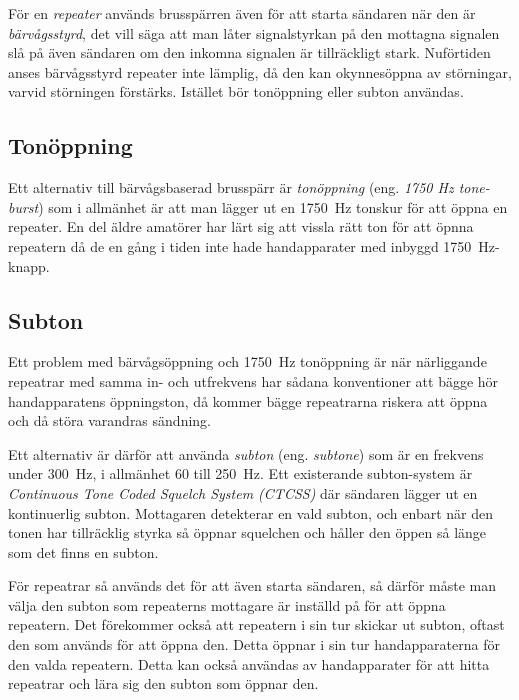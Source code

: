 För en \emph{repeater} används brusspärren även för att starta sändaren när den
är \emph{bärvågsstyrd}, det vill säga att man låter signalstyrkan på den
mottagna signalen slå på även sändaren om den inkomna signalen är tillräckligt
stark.
Nuförtiden anses bärvågsstyrd repeater inte lämplig, då den kan okynnesöppna av
störningar, varvid störningen förstärks.
Istället bör tonöppning eller subton användas.

\subsection{Tonöppning}
\label{tonöppning}

Ett alternativ till bärvågsbaserad brusspärr är \emph{tonöppning} (eng.
\emph{1750 Hz tone-burst}) som i allmänhet är att man lägger ut en
\qty{1750}{\hertz} tonskur för att öppna en repeater.
En del äldre amatörer har lärt sig att vissla rätt ton för att öpnna repeatern
då de en gång i tiden inte hade handapparater med inbyggd 1750~Hz-knapp.

\subsection{Subton}
\label{subton}

Ett problem med bärvågsöppning och \qty{1750}{\hertz} tonöppning är när
närliggande repeatrar med samma in- och utfrekvens har sådana konventioner att
bägge hör handapparatens öppningston, då kommer bägge repeatrarna riskera att
öppna och då störa varandras sändning.

Ett alternativ är därför att använda \emph{subton} (eng. \emph{subtone}) som är
en frekvens under \qty{300}{\hertz}, i allmänhet 60 till \qty{250}{\hertz}.
Ett existerande subton-system är \emph{Continuous Tone Coded Squelch System
  (CTCSS)} där sändaren lägger ut en kontinuerlig subton.
Mottagaren detekterar en vald subton, och enbart när den tonen har tillräcklig
styrka så öppnar squelchen och håller den öppen så länge som det finns en
subton.

För repeatrar så används det för att även starta sändaren, så därför måste man
välja den subton som repeaterns mottagare är inställd på för att öppna
repeatern.
Det förekommer också att repeatern i sin tur skickar ut subton, oftast den som
används för att öppna den.
Detta öppnar i sin tur handapparaterna för den valda repeatern.
Detta kan också användas av handapparater för att hitta repeatrar och lära sig
den subton som öppnar den.

